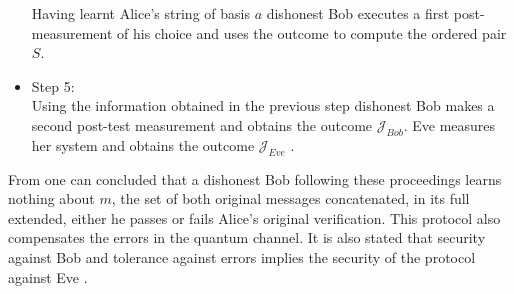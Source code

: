 \begin{refsection}
\begin{itemize}
		Having learnt Alice's string of basis $a$ dishonest Bob executes a first post-measurement of his choice and uses the outcome to compute the ordered pair $S$.
		\item Step 5:\\ Using the information obtained in the previous step dishonest Bob makes a second post-test measurement and obtains the outcome $\mathcal{J}_{Bob}$. Eve measures her system and obtains the outcome $\mathcal{J}_{Eve}$ \cite{Mayers}.
	\end{itemize}
	From \cite{Mayers} one can concluded that a dishonest Bob following these proceedings learns nothing about $m$, the set of both original messages concatenated, in its full extended, either he passes or fails Alice's original verification. This protocol also compensates the errors in the quantum channel. It is also stated that security against Bob and tolerance against errors implies the security of the protocol against Eve \cite{Mayers}.

\end{refsection}
